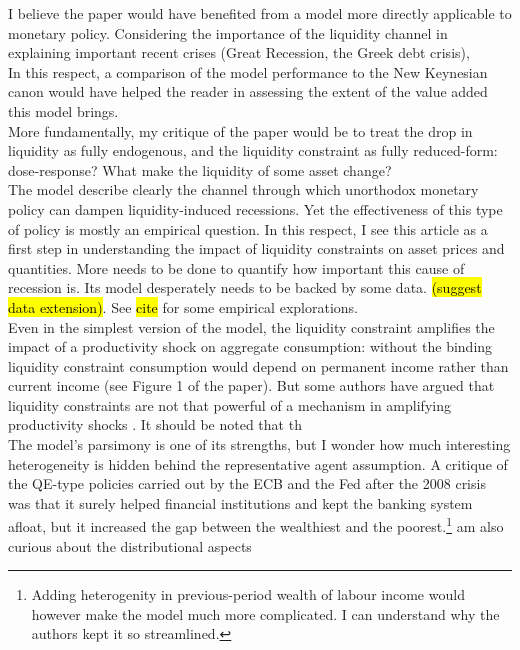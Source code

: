 \documentclass{amsart}
\theoremstyle{definition}
\theoremstyle{remark}
\numberwithin{equation}{section}
\begin{document}
I believe the paper would have benefited from a model more directly applicable to monetary policy. Considering the importance of the liquidity channel in explaining important recent crises (Great Recession, the Greek debt crisis), \\

In this respect, a comparison of the model performance to the New Keynesian canon \citep{gali2015monetary} would have helped the reader in assessing the extent of the value added this model brings.\\

More fundamentally, my critique of the paper would be to treat the drop in liquidity as fully endogenous, and the liquidity constraint as fully reduced-form: dose-response? What make the liquidity of some asset change?\\

The model describe clearly the channel through which unorthodox monetary policy can dampen liquidity-induced recessions. Yet the effectiveness of this type of policy is mostly an empirical question. In this respect, I see this article as a first step in understanding the impact of liquidity constraints on asset prices and quantities. More needs to be done to quantify how important this cause of recession is. Its model desperately needs to be backed by some data. \hl{(suggest data extension)}. See \hl{cite} for some empirical explorations.\\

Even in the simplest version of the model, the liquidity constraint amplifies the impact of a productivity shock on aggregate consumption: without the binding liquidity constraint consumption would depend on permanent income rather than current income (see Figure 1 of the paper). But some authors have argued that liquidity constraints are not that powerful of a mechanism in amplifying productivity shocks \citep{cordoba2004credit}. It should be noted that th \\

The model's parsimony is one of its strengths, but I wonder how much interesting heterogeneity is hidden behind the representative agent assumption. A critique of the QE-type policies carried out by the ECB and the Fed after the 2008 crisis was that it surely helped financial institutions and kept the banking system afloat, but it increased the gap between the wealthiest and the poorest.\footnote{Adding heterogenity in previous-period wealth of labour income would however make the model much more complicated. I can understand why the authors kept it so streamlined.}
am also curious about the distributional aspects 
\end{document}
